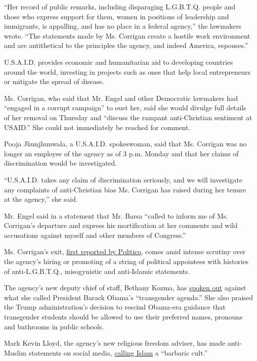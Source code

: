 ``Her record of public remarks, including disparaging L.G.B.T.Q. people
and those who express support for them, women in positions of leadership
and immigrants, is appalling, and has no place in a federal agency,''
the lawmakers wrote. ``The statements made by Ms. Corrigan create a
hostile work environment and are antithetical to the principles the
agency, and indeed America, espouses.''

U.S.A.I.D. provides economic and humanitarian aid to developing
countries around the world, investing in projects such as ones that help
local entrepreneurs or mitigate the spread of disease.

Ms. Corrigan, who said that Mr. Engel and other Democratic lawmakers had
``engaged in a corrupt campaign'' to oust her, said she would divulge
full details of her removal on Thursday and ``discuss the rampant
anti-Christian sentiment at USAID.'' She could not immediately be
reached for comment.

Pooja Jhunjhunwala, a U.S.A.I.D. spokeswoman, said that Ms. Corrigan was
no longer an employee of the agency as of 3 p.m. Monday and that her
claims of discrimination would be investigated.

``U.S.A.I.D. takes any claim of discrimination seriously, and we will
investigate any complaints of anti-Christian bias Ms. Corrigan has
raised during her tenure at the agency,'' she said.

Mr. Engel said in a statement that Mr. Barsa ``called to inform me of
Ms. Corrigan's departure and express his mortification at her comments
and wild accusations against myself and other members of Congress.''

Ms. Corrigan's exit,
\href{https://www.politico.com/news/2020/08/03/usaid-appointee-unloads-as-rocky-tenure-ends-390972}{first
reported by Politico}, comes amid intense scrutiny over the agency's
hiring or promoting of a string of political appointees with histories
of anti-L.G.B.T.Q., misogynistic and anti-Islamic statements.

The agency's new deputy chief of staff, Bethany Kozma, has
\href{https://www.dailysignal.com/2016/07/10/im-a-mom-heres-what-im-doing-to-fight-obamas-transgender-agenda/}{spoken
out} against what she called President Barack Obama's ``transgender
agenda.'' She also praised the Trump administration's decision to
rescind Obama-era guidance that transgender students should be allowed
to use their preferred names, pronouns and bathrooms in public schools.

Mark Kevin Lloyd, the agency's new religious freedom adviser, has made
anti-Muslim statements on social media,
\href{https://apnews.com/d98c99e8626549d984d3695ac6ef589f/Racism-and-talk-of-religious-war:-Trump-staff\%E2\%80\%99s-online-posts}{calling
Islam} a ``barbaric cult.''

